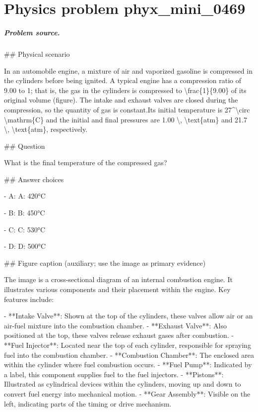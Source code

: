 
\chapter{Physics problem phyx\_mini\_0469}
\label{ch:PhyXMiniProblems_problem_phyx_mini_0469}

\paragraph{Problem source.}
\#\# Physical scenario

In an automobile engine, a mixture of air and vaporized gasoline is compressed in the cylinders before being ignited. A typical engine has a compression ratio of 9.00 to 1; that is, the gas in the cylinders is compressed to \textbackslash{}frac\{1\}\{9.00\} of its original volume (figure). The intake and exhaust valves are closed during the compression, so the quantity of gas is constant.Its initial temperature is 27\textasciicircum{}\textbackslash{}circ \textbackslash{}mathrm\{C\} and the initial and final pressures are 1.00 \textbackslash{}, \textbackslash{}text\{atm\} and 21.7 \textbackslash{}, \textbackslash{}text\{atm\}, respectively.

\#\# Question

What is the final temperature of the compressed gas?

\#\# Answer choices

- A: A: 420°C

- B: B: 450°C

- C: C: 530°C

- D: D: 500°C

\#\# Figure caption (auxiliary; use the image as primary evidence)

The image is a cross-sectional diagram of an internal combustion engine. It illustrates various components and their placement within the engine. Key features include:

- **Intake Valve**: Shown at the top of the cylinders, these valves allow air or an air-fuel mixture into the combustion chamber.
- **Exhaust Valve**: Also positioned at the top, these valves release exhaust gases after combustion.
- **Fuel Injector**: Located near the top of each cylinder, responsible for spraying fuel into the combustion chamber.
- **Combustion Chamber**: The enclosed area within the cylinder where fuel combustion occurs.
- **Fuel Pump**: Indicated by a label, this component supplies fuel to the fuel injectors.
- **Pistons**: Illustrated as cylindrical devices within the cylinders, moving up and down to convert fuel energy into mechanical motion.
- **Gear Assembly**: Visible on the left, indicating parts of the timing or drive mechanism.

